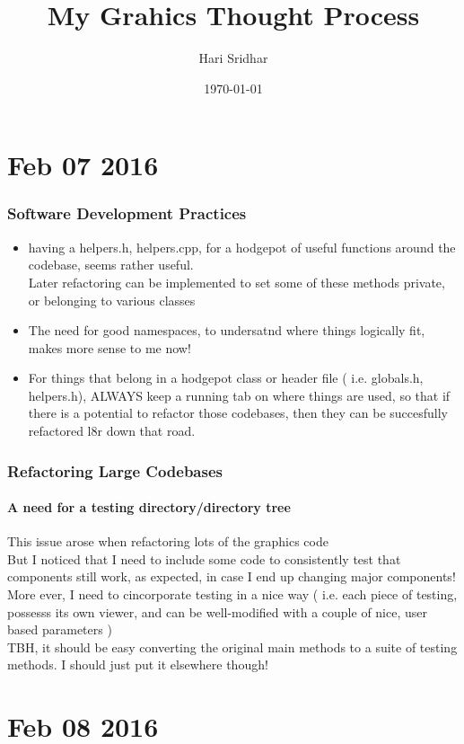 \documentclass{article}
\begin{document}
\title*{My Grahics Thought Process}
\author{Hari Sridhar}
\date{\today}
\newpage

\part{Feb 07 2016}
\section{Software Development Practices}
\begin{itemize}
	\item having a helpers.h, helpers.cpp, for a hodgepot of useful functions around the codebase, seems rather useful. 
	\\ Later refactoring can be implemented to set some of these methods private, or belonging to various classes
	\item The need for good namespaces, to undersatnd where things logically fit, makes more sense to me now!
	\item For things that belong in a hodgepot class or header file ( i.e. globals.h, helpers.h), ALWAYS keep a running tab on where things are used, so that if there is a potential to refactor those codebases, then they can be succesfully refactored l8r down that road.
\end{itemize}

\section{Refactoring Large Codebases}
\subsection{A need for a testing directory/directory tree}
This issue arose when refactoring lots of the graphics code
\\ But I noticed that I need to include some code to consistently test that components still work, as expected, in case I end up changing major components!
\\ More ever, I need to cincorporate testing in a nice way ( i.e. each piece of testing, possesss its own viewer, and can be well-modified with a couple of nice, user based parameters )
\\ TBH, it should be easy converting the original main methods to a suite of testing methods. I should just put it elsewhere though! 
\newpage

\part{Feb 08 2016}
\end{document}
